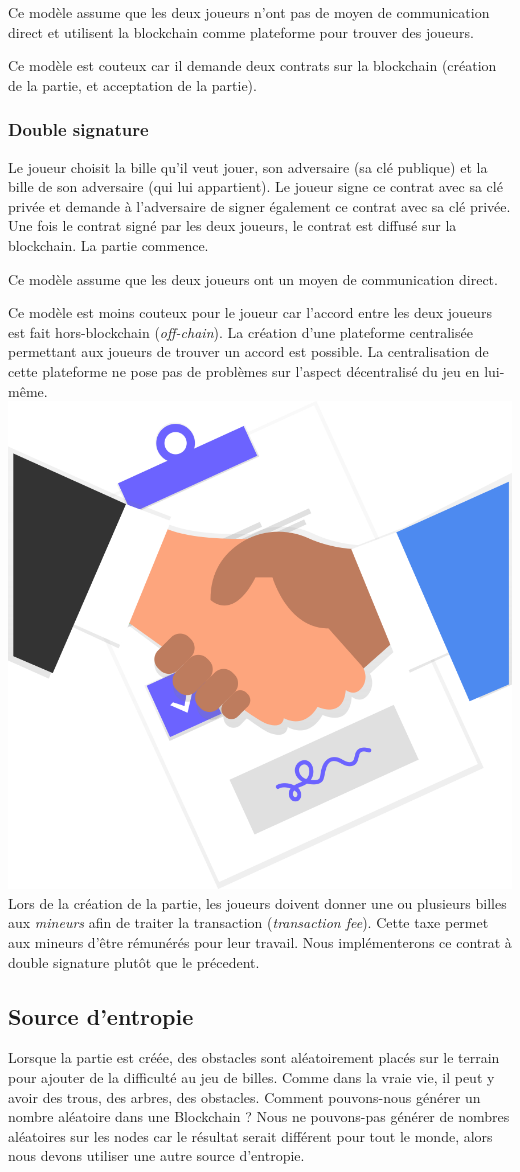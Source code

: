 \documentclass{article}
\begin{document}
Ce modèle assume que les deux joueurs n'ont pas de moyen de communication direct et utilisent la blockchain comme plateforme pour trouver des joueurs.

Ce modèle est couteux car il demande deux contrats sur la blockchain (création de la partie, et acceptation de la partie).


\subsubsection{Double signature}
Le joueur choisit la bille qu'il veut jouer, son adversaire (sa clé publique) et la bille de son adversaire (qui lui appartient). Le joueur signe ce contrat avec sa clé privée et demande à l'adversaire de signer également ce contrat avec sa clé privée. Une fois le contrat signé par les deux joueurs, le contrat est diffusé sur la blockchain. La partie commence.

Ce modèle assume que les deux joueurs ont un moyen de communication direct.

Ce modèle est moins couteux pour le joueur car l'accord entre les deux joueurs est fait hors-blockchain (\textit{off-chain}).
La création d'une plateforme centralisée permettant aux joueurs de trouver un accord est possible. La centralisation de cette plateforme ne pose pas de problèmes sur l'aspect décentralisé du jeu en lui-même.\\


\includegraphics[width=0.3\linewidth]{assets/agreement.png}\\

Lors de la création de la partie, les joueurs doivent donner une ou plusieurs billes aux \textit{mineurs} afin de traiter la transaction (\textit{transaction fee}). Cette taxe permet aux mineurs d'être rémunérés pour leur travail. Nous implémenterons ce contrat à double signature plutôt que le précedent.


\subsection{Source d'entropie}
Lorsque la partie est créée, des obstacles sont aléatoirement placés sur le terrain pour ajouter de la difficulté au jeu de billes. Comme dans la vraie vie, il peut y avoir des trous, des arbres, des obstacles. Comment pouvons-nous générer un nombre aléatoire dans une Blockchain ?
Nous ne pouvons-pas générer de nombres aléatoires sur les nodes car le résultat serait différent pour tout le monde, alors nous devons utiliser une autre source d'entropie.
\end{document}
